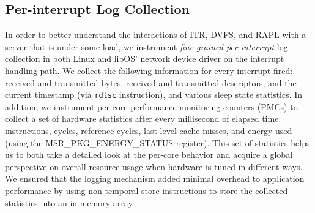 \subsection{Per-interrupt Log Collection}
\label{sec:log_collect}
In order to better understand the interactions of ITR, DVFS, and
RAPL with a server that is under some load, we instrument \textit{fine-grained
per-interrupt} log collection in both Linux and libOS' network device
driver on the interrupt handling path.
We collect the following information for every interrupt fired: received and
transmitted bytes, received and transmitted descriptors, and the current
timestamp (via \texttt{rdtsc} instruction), and various sleep state statistics.
In addition, we instrument per-core performance monitoring counters (PMCs) to
collect a set of hardware statistics after every millisecond of elapsed time:
instructions, cycles, reference cycles, last-level cache misses, and energy
used (using the MSR\_PKG\_ENERGY\_STATUS register).
This set of statistics helps us to both take a detailed look at the per-core
behavior and acquire a global perspective on overall resource usage when
hardware is tuned in different ways.
We ensured that the logging mechanism added minimal overhead to application
performance by using non-temporal store instructions to store the collected
statistics into an in-memory array.
         
